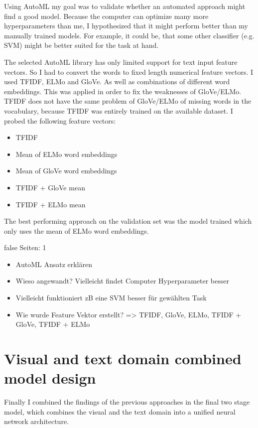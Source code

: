 \documentclass[draft,final,oneside]{vutinfth} %
\begin{document}
Using AutoML my goal was to validate whether an automated approach might find a good model. Because the computer can optimize many more hyperparameters than me, I hypothesized that it might perform better than my manually trained models. For example, it could be, that some other classifier (e.g. SVM) might be better suited for the task at hand.

The selected AutoML library has only limited support for text input feature vectors. So I had to convert the words to fixed length numerical feature vectors. I used TFIDF, ELMo and GloVe. As well as combinations of different word embeddings. This was applied in order to fix the weaknesses of GloVe/ELMo. TFIDF does not have the same problem of GloVe/ELMo of missing words in the vocabulary, because TFIDF was entirely trained on the available dataset. I probed the following feature vectors:

\begin{itemize}

\item TFIDF
\item Mean of ELMo word embeddings
\item Mean of GloVe word embeddings
\item TFIDF + GloVe mean
\item TFIDF + ELMo mean

\end{itemize}

The best performing approach on the validation set was the model trained which only uses the mean of ELMo word embeddings.

\if false
Seiten: 1

\begin{itemize}
\item AutoML Ansatz erklären
\item Wieso angewandt? Vielleicht findet Computer Hyperparameter besser
\item Vielleicht funktioniert zB eine SVM besser für gewählten Task
\item Wie wurde Feature Vektor erstellt? => TFIDF, GloVe, ELMo, TFIDF + GloVe, TFIDF + ELMo
\end{itemize}
\fi

\section{Visual and text domain combined model design}

Finally I combined the findings of the previous approaches in the final two stage model, which combines the visual and the text domain into a unified neural network architecture.
\end{document}
